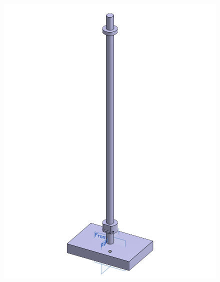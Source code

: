 \begin{figure}[H]
	\centering
	\begin{minipage}[b]{0.48\textwidth}
		\centering
		\includegraphics[width=\textwidth]{Assests/Part1.png}
	\end{minipage}
	\hfill
	\begin{minipage}[b]{0.48\textwidth}
		\centering

\end{minipage}
\end{figure}
